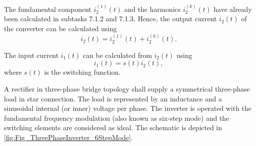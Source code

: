 
\newpage
\begin{solutionblock}
The fundamental component $i^\mathrm{(1)}_\mathrm{2}(t)$ and the harmonics $i^{(k)}_\mathrm{2}(t)$ have already been calculated in subtasks 7.1.2 and 7.1.3. Hence,
the output current $i_\mathrm{2}(t)$ of the converter can be calculated using 
\begin{equation}
    i_\mathrm{2}(t) = i^\mathrm{(1)}_\mathrm{2}(t) + i^{(k)}_\mathrm{2}(t).
    \label{7.1.2:eq:approx_i_2}         
\end{equation}
\end{solutionblock} 


\begin{solutionblock}
    The input current $i_\mathrm{1}(t)$ can be calculated from $i_\mathrm{2}(t)$ using 
    \begin{equation}
        i_\mathrm{1}(t) = s(t) i_\mathrm{2}(t),
        \label{7.1.2:eq:input_current_i_1}         
    \end{equation}
    where $s(t)$ is the switching function.
    \end{solutionblock}








\newpage



A rectifier in three-phase bridge topology shall supply a
symmetrical three-phase load in star connection. The load is represented by an inductance and 
a sinusoidal internal (or inner) voltage per phase. The inverter is operated with the fundamental 
frequency modulation (also known as six-step mode) and the switching elements are considered as ideal. 
The schematic is depicted in \autoref{fig:Fig_ThreePhaseInverter_6StepMode}.



